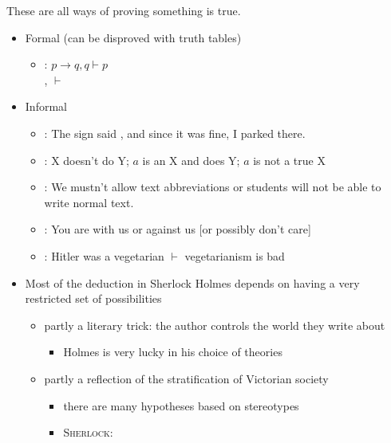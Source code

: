\documentclass[a4paper,landscape,headrule,footrule,xetex]{foils}
\begin{document}
These are all ways of proving something is true.


\begin{itemize}
\item Formal (can be disproved with truth tables)
  \begin{itemize}
  \item {}: $p \rightarrow q, q \vdash p$
    \\ ,  $\vdash$ 
  \end{itemize}
\item Informal
  \begin{itemize}
  \item {}:  The sign said , and since it was fine, I parked there. 
  \item {}: X doesn't do Y; $a$ is an X and does Y; $a$ is not a true X
  \item {}: We mustn't allow text abbreviations or students will not be able to write normal text.
  \item {}: You are with us or against us [or possibly don't care]
  \item {}: Hitler was a vegetarian  $\vdash$ vegetarianism is bad
  \end{itemize}
\end{itemize}



\begin{itemize}
\item Most of the deduction in Sherlock Holmes depends on having a
  very restricted set of possibilities
  \begin{itemize}
  \item partly a literary trick: the author controls the world they write about
    \begin{itemize}
    \item Holmes is very lucky in his choice of theories
    \end{itemize}
  \item partly a reflection of the stratification of Victorian society
    \begin{itemize}
    \item there are many hypotheses based on stereotypes
    \item \textsc{Sherlock:}  
    \end{itemize}
  \end{itemize}
\end{itemize}
\end{document}
